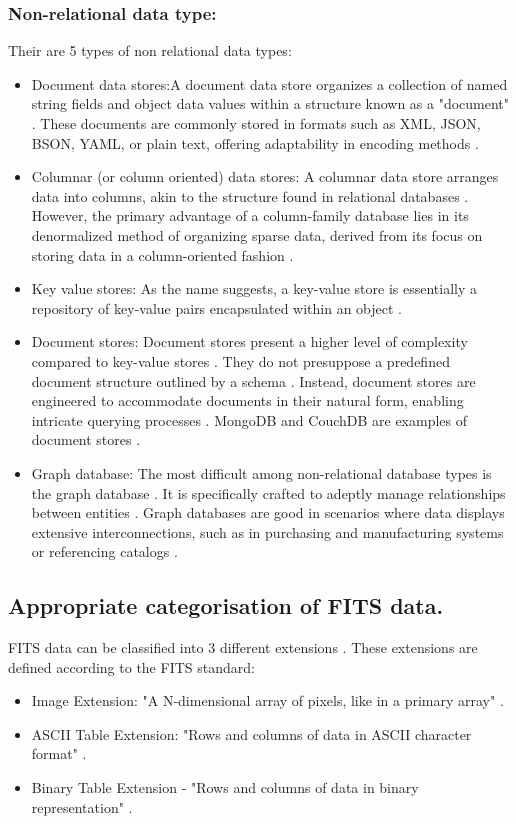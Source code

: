 \documentclass[a4paper,oneside,11pt]{book}
\begin{document}
\subsubsection{Non-relational data type:}
Their are 5 types of non relational data types:
\begin{itemize}
    \item Document data stores:A document data store organizes a collection of named string fields and object data values within a structure known as a "document" \citep{pattinson2022relational}. These documents are commonly stored in formats such as XML, JSON, BSON, YAML, or plain text, offering adaptability in encoding methods \citep{pattinson2022relational}.
    \item Columnar (or column oriented) data stores: A columnar data store arranges data into columns, akin to the structure found in relational databases \citep{pattinson2022relational}. However, the primary advantage of a column-family database lies in its denormalized method of organizing sparse data, derived from its focus on storing data in a column-oriented fashion \citep{pattinson2022relational}.
    \item Key value stores: As the name suggests, a key-value store is essentially a repository of key-value pairs encapsulated within an object \citep{pattinson2022relational}.
    \item Document stores: Document stores present a higher level of complexity compared to key-value stores \citep{pattinson2022relational}. They do not presuppose a predefined document structure outlined by a schema \citep{pattinson2022relational}. Instead, document stores are engineered to accommodate documents in their natural form, enabling intricate querying processes \citep{pattinson2022relational}. MongoDB and CouchDB are examples of document stores \citep{pattinson2022relational}.
    \item Graph database: The most difficult among non-relational database types is the graph database \citep{pattinson2022relational}. It is specifically crafted to adeptly manage relationships between entities \citep{pattinson2022relational}. Graph databases are good in scenarios where data displays extensive interconnections, such as in purchasing and manufacturing systems or referencing catalogs \citep{pattinson2022relational}.
\end{itemize}
\pagestyle{plain}
\subsection{Appropriate categorisation of FITS data.}
FITS data can be classified into 3 different extensions \citep{pence2010definition}. These extensions are defined according to the FITS standard:
\begin{itemize}
    \item Image Extension: "A N-dimensional array of pixels, like in a primary array" \citep{pence2010definition}.
    \item ASCII Table Extension: "Rows and columns of data in ASCII character format" \citep{pence2010definition}.
    \item Binary Table Extension - "Rows and columns of data in binary representation" \citep{pence2010definition}.
\end{itemize}
\end{document}
